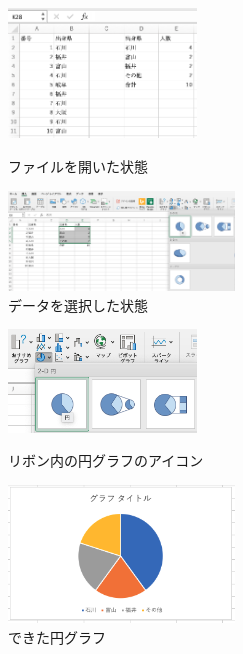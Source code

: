 \begin{figure}[tb]
    \begin{minipage}{0.5\hsize}
        \centering
        \includegraphics[width=5cm]{chap2/piechart_data.png}
        \caption{ファイルを開いた状態}
        \label{fig:piechart_data}
    \end{minipage}
    \begin{minipage}{0.5\hsize}
        \centering
        \includegraphics[width=6cm]{chap2/piechart_select_data.png}
        \caption{データを選択した状態}
        \label{fig:piechart_select_data}
    \end{minipage}
\end{figure}
\begin{figure}[tb]
    \begin{minipage}{0.5\hsize}
        \centering
        \includegraphics[width=5cm]{chap2/piechart_menu.png}
        \caption{リボン内の円グラフのアイコン}
        \label{fig:piechart_menu}
    \end{minipage}
    \begin{minipage}{0.5\hsize}
        \centering
        \includegraphics[width=6cm]{chap2/piechart_plain.png}
        \caption{できた円グラフ}
        \label{fig:piechart_plain}
    \end{minipage}
\end{figure}
